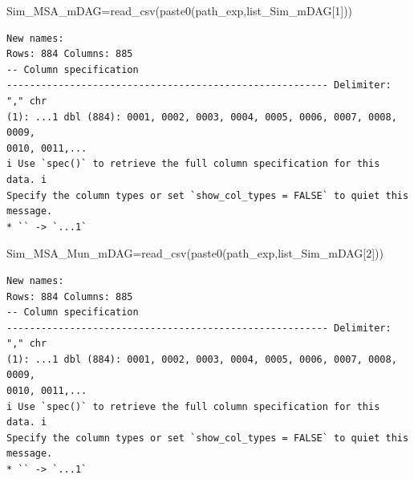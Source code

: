 \documentclass[
  letterpaper,
  DIV=11,
  numbers=noendperiod]{scrreprt}
\newenvironment{Shaded}{\begin{snugshade}}{\end{snugshade}}
\newcommand{\DecValTok}[1]{\textcolor[rgb]{0.68,0.00,0.00}{#1}}
\newcommand{\FunctionTok}[1]{\textcolor[rgb]{0.28,0.35,0.67}{#1}}
\newcommand{\NormalTok}[1]{\textcolor[rgb]{0.00,0.23,0.31}{#1}}
\newcommand{\OtherTok}[1]{\textcolor[rgb]{0.00,0.23,0.31}{#1}}
\newcommand{\SpecialCharTok}[1]{\textcolor[rgb]{0.37,0.37,0.37}{#1}}
\begin{document}
\begin{Shaded}
\begin{Highlighting}[]
\NormalTok{Sim\_MSA\_mDAG}\OtherTok{=}\FunctionTok{read\_csv}\NormalTok{(}\FunctionTok{paste0}\NormalTok{(path\_exp,list\_Sim\_mDAG[}\DecValTok{1}\NormalTok{]))}
\end{Highlighting}
\end{Shaded}

\begin{verbatim}
New names:
Rows: 884 Columns: 885
-- Column specification
-------------------------------------------------------- Delimiter: "," chr
(1): ...1 dbl (884): 0001, 0002, 0003, 0004, 0005, 0006, 0007, 0008, 0009,
0010, 0011,...
i Use `spec()` to retrieve the full column specification for this data. i
Specify the column types or set `show_col_types = FALSE` to quiet this message.
* `` -> `...1`
\end{verbatim}

\begin{Shaded}
\end{Shaded}

\begin{Shaded}
\begin{Highlighting}[]
\NormalTok{Sim\_MSA\_Mun\_mDAG}\OtherTok{=}\FunctionTok{read\_csv}\NormalTok{(}\FunctionTok{paste0}\NormalTok{(path\_exp,list\_Sim\_mDAG[}\DecValTok{2}\NormalTok{]))}
\end{Highlighting}
\end{Shaded}

\begin{verbatim}
New names:
Rows: 884 Columns: 885
-- Column specification
-------------------------------------------------------- Delimiter: "," chr
(1): ...1 dbl (884): 0001, 0002, 0003, 0004, 0005, 0006, 0007, 0008, 0009,
0010, 0011,...
i Use `spec()` to retrieve the full column specification for this data. i
Specify the column types or set `show_col_types = FALSE` to quiet this message.
* `` -> `...1`
\end{verbatim}
\end{document}
